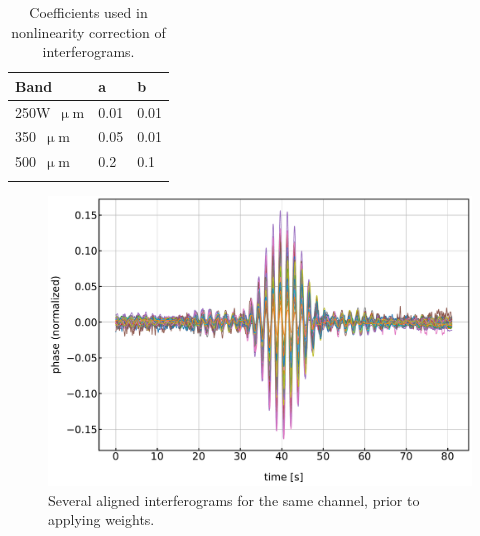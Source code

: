 \begin{table}[!htbp]
\centering
\begin{tabular}{@{}lll@{}}
\dtoprule{}
Band & a & b \\ \midrule
250W~$\upmu$m & 0.01 & 0.01 \\
350~$\upmu$m & 0.05 & 0.01 \\
500~$\upmu$m & 0.2 & 0.1 \\ \dbottomrule{}
\\
\end{tabular}
\caption{Coefficients used in nonlinearity correction of interferograms.}
\label{table:interf coeffs}
\end{table}

\begin{figure}[!htbp]
\centering
\includegraphics[width=\textwidth]{figures/blast_data/fts/interfs_350_lpf}
\caption{Several aligned interferograms for the same channel, prior to applying weights.}
\label{fig:interf lpf stack}
\end{figure}

